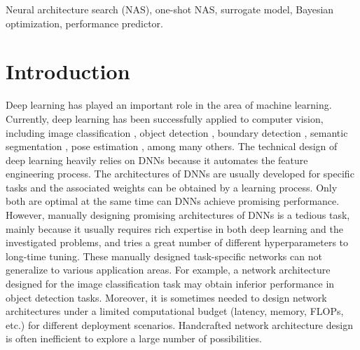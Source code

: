 \documentclass[journal]{IEEEtran}
\begin{document}
\begin{IEEEkeywords}
Neural architecture search (NAS), one-shot NAS, surrogate model, Bayesian optimization, performance predictor.
\end{IEEEkeywords}



%
\IEEEpeerreviewmaketitle



\section{Introduction}

Deep learning has played an important role in the area of machine learning. Currently, deep learning has been successfully applied to computer vision, including image classification \cite{he2016deep, huang2017densely, krizhevsky2012imagenet, simonyan2014very, szegedy2015going}, object detection \cite{girshick2015fast, ren2015faster, liu2016ssd, redmon2016you}, boundary detection \cite{xie2015holistically}, semantic segmentation \cite{chen2017deeplab, he2017mask, long2015fully}, pose estimation \cite{toshev2014human}, among many others. The technical design of deep learning heavily relies on DNNs because it automates the feature engineering process. The architectures of DNNs are usually developed for specific tasks and the associated weights can be obtained by a learning process. Only both are optimal at the same time can DNNs achieve promising performance. However, manually designing promising architectures of DNNs is a tedious task, mainly because it usually requires rich expertise in both deep learning and the investigated problems, and tries a great number of different hyperparameters to long-time tuning. These manually designed task-specific networks can not generalize to various application areas. For example, a network architecture designed for the image classification task may obtain inferior performance in object detection tasks. Moreover, it is sometimes needed to design network architectures under a limited computational budget (latency, memory, FLOPs, etc.) for different deployment scenarios. Handcrafted network architecture design is often inefficient to explore a large number of possibilities.
\end{document}
